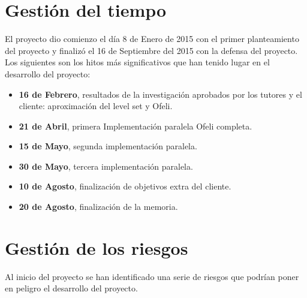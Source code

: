 \section{Gesti\'{o}n del tiempo}

El proyecto dio comienzo el d\'{i}a 8 de Enero de 2015 con el primer planteamiento del proyecto y finaliz\'{o} el 16 de Septiembre del 2015 con la defensa del proyecto. Los siguientes son los hitos m\'{a}s significativos que han tenido lugar en el desarrollo del proyecto:

\begin{itemize}
	\item \textbf{16 de Febrero},  resultados de la investigaci\'{o}n aprobados por los tutores y el cliente: aproximaci\'{o}n del level set y Ofeli.
	\item \textbf{21 de Abril}, primera Implementaci\'{o}n paralela Ofeli completa.
	\item \textbf{15 de Mayo}, segunda implementaci\'{o}n paralela.
	\item \textbf{30 de Mayo}, tercera implementaci\'{o}n paralela.
	\item \textbf{10 de Agosto}, finalizaci\'{o}n de objetivos extra del cliente.
	\item \textbf{20 de Agosto}, finalizaci\'{o}n de la memoria.
\end{itemize}




\section{Gesti\'{o}n de los riesgos}\label{riesgos}

Al inicio del proyecto se han identificado una serie de riesgos que podr\'{i}an poner en peligro el desarrollo del proyecto.


